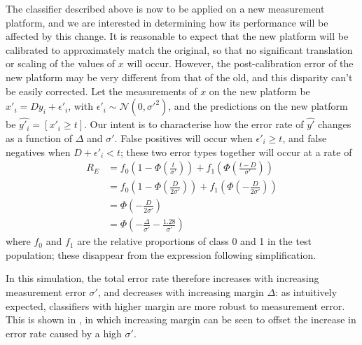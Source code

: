 \documentclass[dissertation.tex]{subfiles}
\begin{document}
The classifier described above is now to be applied on a new measurement platform, and we are interested in determining how its performance will be affected by this change.  It is reasonable to expect that the new platform will be calibrated to approximately match the original, so that no significant translation or scaling of the values of $x$ will occur.  However, the post-calibration error of the new platform may be very different from that of the old, and this disparity can't be easily corrected.  Let the measurements of $x$ on the new platform be $x'_i = D y_i + \epsilon'_i$, with $\epsilon'_i \sim \mathcal{N}(0, \sigma'^2)$, and the predictions on the new platform be $\hat{y'_i} = [x'_i \geq t]$.  Our intent is to characterise how the error rate of $\hat{y'}$ changes as a function of $\Delta$ and $\sigma'$.  False positives will occur when $\epsilon'_i \geq t$, and false negatives when $D + \epsilon'_i < t$; these two error types together will occur at a rate of
\begin{align*}
R_E &= f_0\left(1-\Phi\left(\frac{t}{\sigma'}\right)\right) + f_1\left(\Phi\left(\frac{t-D}{\sigma'}\right)\right) \\
    &= f_0\left(1-\Phi\left(\frac{D}{2\sigma'}\right)\right) + f_1\left(\Phi\left(-\frac{D}{2\sigma'}\right)\right) \\
    &= \Phi\left(-\frac{D}{2\sigma'}\right) \\
    &= \Phi\left(-\frac{\Delta}{\sigma'} - \frac{1.28}{\sigma'}\right)
\end{align*}
where $f_0$ and $f_1$ are the relative proportions of class 0 and 1 in the test population; these disappear from the expression following simplification.

In this simulation, the total error rate therefore increases with increasing measurement error $\sigma'$, and decreases with increasing margin $\Delta$: as intuitively expected, classifiers with higher margin are more robust to measurement error.  This is shown in , in which increasing margin can be seen to offset the increase in error rate caused by a high $\sigma'$.
\end{document}
